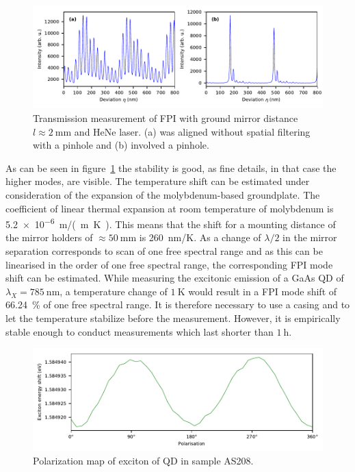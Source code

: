 \begin{figure}[H]
	\centering
	\includegraphics[width=\linewidth]{figures/fabry-perot/plots/measurement-fabry-perot-HeNe}
	\caption{Transmission measurement of FPI with ground mirror distance $l \approx \SI{2}{\milli \meter}$ and HeNe laser. (a) was aligned without spatial filtering with a pinhole and (b) involved a pinhole.}
	\label{fig:measurement-fabry-perot-hene}
\end{figure}

As can be seen in figure~\ref{fig:measurement-fabry-perot-hene} the stability is good, as fine details, in that case the higher modes, are visible.
The temperature shift can be estimated under consideration of the expansion of the molybdenum-based groundplate.
The coefficient of linear thermal expansion at room temperature of molybdenum is \SI{5.2e-6}{\meter /(\meter \kelvin)}.
This means that the shift for a mounting distance of the mirror holders of $\approx \SI{50}{\milli \meter}$ is \SI{260}{\nano \meter / \kelvin}.
As a change of $\lambda/2$ in the mirror separation corresponds to scan of one free spectral range and as this can be linearised in the order of one free spectral range, the corresponding \ac{FPI} mode shift can be estimated.
While measuring the excitonic emission of a GaAs \ac{QD} of $\lambda_X = \SI{785}{\nano \meter}$, a temperature change of $\SI{1}{\kelvin}$ would result in a \ac{FPI} mode shift of \SI{66.24}{\percent} of one free spectral range.
It is therefore necessary to use a casing and to let the temperature stabilize before the measurement.
However, it is empirically stable enough to conduct measurements which last shorter than $\SI{1}{\hour}$.

\begin{figure}[H]
	\centering
	\includegraphics[width=\linewidth]{figures/fabry-perot/plots/measurement-fabry-perot-dot-exciton-pol-map}
	\caption{Polarization map of exciton of QD in sample AS208.}
	\label{fig:measurement-fabry-perot-dot-exciton-pol-map}
\end{figure}

